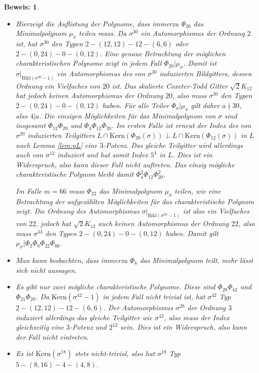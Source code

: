 \documentclass[12pt,a4paper,halfparskip,headsepline,bibtotocnumbered]{scrreprt}
\theoremstyle{nummermitklammern}
\theoremstyle{nonumberbreak}
\newtheorem{beweis}{Beweis:}
\newcommand{\Kern}{\text{Kern}}
\newcommand{\Bild}{\text{Bild}}
\begin{document}
\begin{beweis}
\begin{itemize}[align=left, leftmargin = *]
		\item[$m = 60 = 2^2 \cdot 3 \cdot 5$:] Hierzeigt die Auflistung der Polynome, dass immerzu $\Phi_{20}$ das Minimalpolynom $\mu_\sigma$ teilen muss. Da $\sigma^{30}$ ein Automorphismus der Ordnung $2$ ist, hat $\sigma^{30}$ den Typen $2 - (12, 12) - 12 - (6, 6)$ oder $2 - (0, 24) - 0 - (0, 12)$.  Eine genaue Betrachtung der möglichen charakteristischen Polynome zeigt in jedem Fall $\Phi_{20} \vert \mu_\sigma$. Damit ist $\sigma\vert_{\Bild(\sigma^{30}-1)}$ ein Automorphismus des von $\sigma^{30}$ induzierten Bildgitters, dessen Ordnung ein Vielfaches von $20$ ist. Das skalierte Coxeter-Todd Gitter $\sqrt{2}K_{12}$ hat jedoch keinen Automorphismus der Ordnung $20$, also muss $\sigma^{30}$ den Typen $2 - (0, 24) - 0 - (0, 12)$ haben. Für alle Teiler $\Phi_a \vert \mu_\sigma$ gilt daher $a \nmid 30$, also $4 \vert a$. Die einzigen Möglichkeiten für das Minimalpolynom von $\sigma$ sind insgesamt $\Phi_{12} \Phi_{20}$ und $\Phi_4 \Phi_{12} \Phi_{20}$. Im ersten Falle ist erneut der Index des von $\sigma^{20}$ induzierten Teilgitters $L \cap \Kern(\Phi_{20}(\sigma)) \perp L \cap \Kern(\Phi_{12}(\sigma))$ in $L$ nach Lemma \eqref{lem:pL} eine $3$-Potenz. Das gleiche Teilgitter wird allerdings auch von $\sigma^{12}$ induziert und hat somit Index $5^4$ in $L$. Dies ist ein Widerspruch, also kann dieser Fall nicht auftreten. Das einzig mögliche charakteristische Polynom bleibt damit $\Phi_4^2 \Phi_{12} \Phi_{20}^2$.\par
	Im Falle $m = 66$ muss $\Phi_{22}$ das Minimalpolynom $\mu_\sigma$ teilen, wie eine Betrachtung der aufgezählten Möglichkeiten für das charakteristische Polynom zeigt. Die Ordnung des Automorphismus $\sigma\vert_{\Bild(\sigma^{33}-1)}$ ist also ein Vielfaches von $22$, jedoch hat $\sqrt{2} K_{12}$ auch keinen Automorphismus der Ordnung $22$, also muss $\sigma^{33}$ den Typen $2 - (0, 24) - 0 - (0, 12)$ haben. Damit gilt $\mu_\sigma \vert \Phi_{2} \Phi_{6} \Phi_{22} \Phi_{66}$.
		\item[$m = 72 = 2^3 \cdot 3^2$:] Man kann beobachten, dass immerzu $\Phi_8$ das Minimalpolynom teilt, mehr lässt sich nicht aussagen.
		\item[$m = 84 = 2^2 \cdot 3 \cdot 7$:] Es gibt nur zwei mögliche charakteristische Polynome. Diese sind $\Phi_{28} \Phi_{42}$ und $\Phi_{21} \Phi_{28}$. Da $\Kern(\sigma^{42}-1)$ in jedem Fall nicht trivial ist, hat $\sigma^{42}$ Typ $2 - (12, 12) - 12 - (6, 6)$. Der Automorphismus $\sigma^{28}$ der Ordnung $3$ induziert allerdings das gleiche Teilgitter wie $\sigma^{42}$, also muss der Index gleichzeitig eine $3$-Potenz und $2^{12}$ sein. Dies ist ein Widerspruch, also kann der Fall nicht eintreten.
		\item[$m = 90 = 2 \cdot 3^2 \cdot 5$:] Es ist $\Kern(\sigma^{18})$ stets nicht-trivial, also hat $\sigma^{18}$ Typ $5 - (8, 16) - 4 - (4, 8)$.
	\end{itemize}
\end{beweis}
\end{document}
